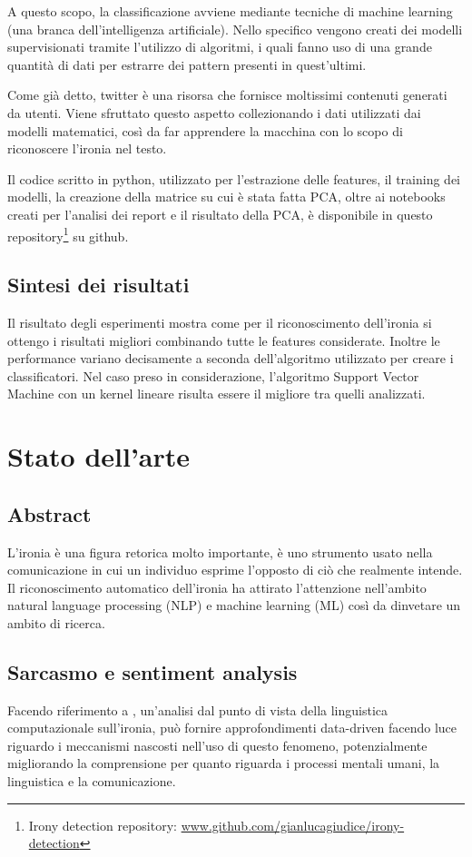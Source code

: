 \documentclass[oneside]{book}
\begin{document}
A questo scopo, la classificazione avviene mediante tecniche di machine learning (una branca dell'intelligenza artificiale). Nello specifico vengono creati dei modelli supervisionati tramite l'utilizzo di algoritmi, i quali fanno uso di una grande quantità di dati per estrarre dei pattern presenti in quest'ultimi.

Come già detto, twitter è una risorsa che fornisce moltissimi contenuti generati da utenti. Viene sfruttato questo aspetto collezionando i dati utilizzati dai modelli matematici, così da far apprendere la macchina con lo scopo di riconoscere l'ironia nel testo.

Il codice scritto in python, utilizzato per l'estrazione delle features, il training dei modelli, la creazione della matrice su cui è stata fatta PCA, oltre ai notebooks creati per l'analisi dei report e il risultato della PCA, è disponibile in questo repository\footnote{Irony detection repository: \url{www.github.com/gianlucagiudice/irony-detection}} su github.

\section{Sintesi dei risultati}
Il risultato degli esperimenti mostra come per il riconoscimento dell'ironia si ottengo i risultati migliori combinando tutte le features considerate. Inoltre le performance variano decisamente a seconda dell'algoritmo utilizzato per creare i classificatori. Nel caso preso in considerazione, l'algoritmo Support Vector Machine con un kernel lineare risulta essere il migliore tra quelli analizzati.

\chapter{Stato dell'arte}

\section*{Abstract}
L'ironia è una figura retorica molto importante, è uno strumento usato nella comunicazione in cui un individuo esprime l'opposto di ciò che realmente intende. Il riconoscimento automatico dell'ironia ha attirato l'attenzione nell'ambito natural language
processing (NLP) e machine learning (ML) così da dinvetare un ambito di ricerca. 

\section{Sarcasmo e sentiment analysis}
Facendo riferimento a \cite{survey4}, un'analisi dal punto di vista della linguistica computazionale sull'ironia, può fornire approfondimenti data-driven facendo luce riguardo i meccanismi nascosti nell'uso di questo fenomeno, potenzialmente migliorando la comprensione per quanto riguarda i processi mentali umani, la linguistica e la comunicazione. 
\end{document}
